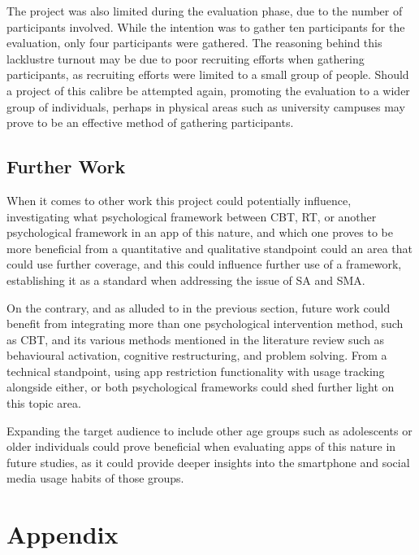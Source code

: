 \documentclass[12pt]{article}
\begin{document}
The project was also limited during the evaluation phase, due to the number of participants involved. While the intention was to gather ten participants for the evaluation, only 
four participants were gathered. The reasoning behind this lacklustre turnout may be due to poor recruiting efforts when gathering participants, as recruiting 
efforts were limited to a small group of people. Should a project of this calibre be attempted again, promoting the evaluation to a wider group of individuals, perhaps in 
physical areas such as university campuses may prove to be an effective method of gathering participants.

\subsection{Further Work}
When it comes to other work this project could potentially influence, investigating what psychological framework between CBT, RT, or another psychological framework 
in an app of this nature, and which one proves to be more beneficial from a quantitative and qualitative standpoint could an area that could use further coverage, and this 
could influence further use of a framework, establishing it as a standard when addressing the issue of SA and SMA. \newline

On the contrary, and as alluded to in the previous section, future work could benefit from integrating more than one psychological intervention method, such as CBT, and 
its various methods mentioned in the literature review such as behavioural activation, cognitive restructuring, and problem solving. From a technical standpoint, using
app restriction functionality with usage tracking alongside either, or both psychological frameworks could shed further light on this topic area.\newline

Expanding the target audience to include other age groups such as adolescents or older individuals could prove beneficial when evaluating apps of this nature in future 
studies, as it could provide deeper insights into the smartphone and social media usage habits of those groups.




\newpage
{}
\printbibliography

\newpage
\section{Appendix}
\end{document}
